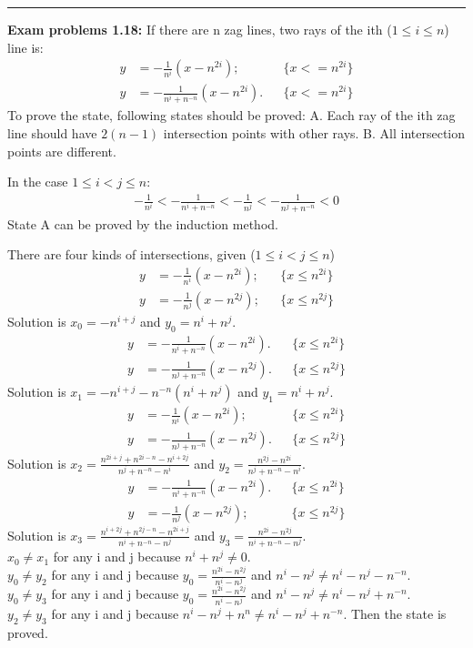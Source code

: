 \documentclass{article}
\begin{document}
\noindent\rule{\textwidth}{0.4pt}
\textbf{Exam problems 1.18:} 
If there are n zag lines, two rays of the ith ($1\le i \le n$) line is:
\begin{align}
y &= -\frac{1}{n^i}(x-n^{2i}); && \{x<=n^{2i}\}\\
y &= -\frac{1}{n^i+n^{-n}}(x-n^{2i}). && \{x<=n^{2i}\}
\end{align}
To prove the state, following states should be proved: 
A. Each ray of the ith zag line should have $2(n-1)$ intersection points with other rays.
B. All intersection points are different.

In the case $1\le i<j\le n$:
\begin{align}
-\frac{1}{n^i} < -\frac{1}{n^i+n^{-n}} < -\frac{1}{n^j} < -\frac{1}{n^j+n^{-n}} < 0
\end{align}
State A can be proved by the induction method.


There are four kinds of intersections, given ($1\le i < j \le n$) 
\begin{align}
y &= -\frac{1}{n^i}(x-n^{2i}); && \{x \le n^{2i}\}\\
y &= -\frac{1}{n^j}(x-n^{2j}); && \{x \le n^{2j}\}
\end{align}
Solution is $x_0 = -n^{i+j}$ and $y_0 =n^i+n^j$.
\begin{align}
y &= -\frac{1}{n^i+n^{-n}}(x-n^{2i}). && \{x \le n^{2i}\}\\
y &= -\frac{1}{n^j+n^{-n}}(x-n^{2j}). && \{x \le n^{2j}\}
\end{align}
Solution is $x_1 = -n^{i+j} - n^{-n}(n^i+n^j)$ and $y_1 =n^i+n^j$.
\begin{align}
y &= -\frac{1}{n^i}(x-n^{2i}); && \{x \le n^{2i}\}\\
y &= -\frac{1}{n^j+n^{-n}}(x-n^{2j}). && \{x \le n^{2j}\}
\end{align}
Solution is $x_2 = \frac{n^{2i+j} + n^{2i-n} - n^{i+2j}}{n^j+n^{-n} - n^i}$ and $y_2 =\frac{n^{2j}-n^{2i}}{n^j+n^{-n} - n^i}$.
\begin{align}
y &= -\frac{1}{n^i+n^{-n}}(x-n^{2i}). && \{x \le n^{2i}\}\\
y &= -\frac{1}{n^j}(x-n^{2j}); && \{x \le n^{2j}\}
\end{align}
Solution is $x_3 = \frac{n^{i+2j} + n^{2j-n} - n^{2i+j}}{n^i+n^{-n} - n^j}$ and $y_3 =\frac{n^{2i}-n^{2j}}{n^i+n^{-n} - n^j}$.\\
$x_0 \neq x_1$ for any i and j because $n^i + n^j \neq 0$.\\
$y_0 \neq y_2$ for any i and j because $y_0 = \frac{n^{2i} - n^{2j}}{n^i - n^j}$ and $n^i - n^j \neq n^i - n^j -n^{-n}$.\\
$y_0 \neq y_3$ for any i and j because $y_0 = \frac{n^{2i} - n^{2j}}{n^i - n^j}$ and $n^i - n^j \neq n^i - n^j +n^{-n}$.\\
$y_2 \neq y_3$ for any i and j because $n^i - n^j +n^n \neq n^i - n^j +n^{-n}$.
Then the state is proved.
\end{document}

